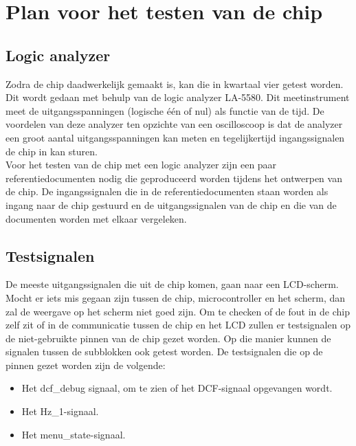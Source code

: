 \chapter{Plan voor het testen van de chip}

\section{Logic analyzer}
Zodra de chip daadwerkelijk gemaakt is, kan die in kwartaal vier getest worden. Dit wordt gedaan met behulp van de logic analyzer LA-5580. Dit meetinstrument meet de uitgangsspanningen (logische \'e\'en of nul) als functie van de tijd. De voordelen van deze analyzer ten opzichte van een oscilloscoop is dat de analyzer een groot aantal uitgangsspanningen kan meten en tegelijkertijd ingangssignalen de chip in kan sturen.\\
Voor het testen van de chip met een logic analyzer zijn een paar referentiedocumenten nodig die geproduceerd worden tijdens het ontwerpen van de chip. De ingangssignalen die in de referentiedocumenten staan worden als ingang naar de chip gestuurd en de uitgangssignalen van de chip en die van de documenten worden met elkaar vergeleken.

\section{Testsignalen}
De meeste uitgangssignalen die uit de chip komen, gaan naar een LCD-scherm. Mocht er iets mis gegaan zijn tussen de chip, microcontroller en het scherm, dan zal de weergave op het scherm niet goed zijn. Om te checken of de fout in de chip zelf zit of in de communicatie tussen de chip en het LCD zullen er testsignalen op de niet-gebruikte pinnen van de chip gezet worden. Op die manier kunnen de signalen tussen de subblokken ook getest worden.
De testsignalen die op de pinnen gezet worden zijn de volgende:
\begin{itemize}
\item Het dcf\_debug signaal, om te zien of het DCF-signaal opgevangen wordt.
\item Het Hz\_1-signaal.
\item Het menu\_state-signaal.
\end{itemize}